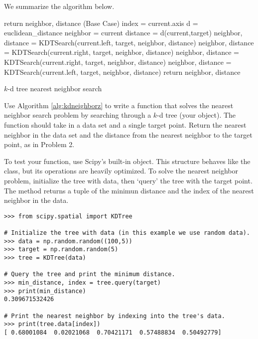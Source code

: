 We summarize the algorithm below.

\begin{algorithm}
\begin{algorithmic}[1]
    \State return neighbor, distance (Base Case)
\EndIf
\State index = current.axis
\State d = euclidean\_distance
		\State neighbor = current
		\State distance = d(current,target)
	\EndIf
		\State neighbor, distance = KDTSearch(current.left, target,
			\State									neighbor, distance)
			\State neighbor, distance = KDTSearch(current.right, target,
				\State									neighbor, distance)
		\EndIf
	\Else
		\State neighbor, distance = KDTSearch(current.right, target,
			\State									neighbor, distance)
			\State neighbor, distance = KDTSearch(current.left, target,
				\State									neighbor, distance)
		\EndIf
	\EndIf
\State return neighbor, distance
\EndProcedure
\end{algorithmic}
\caption{$k$-d tree nearest neighbor search}
\label{alg:kdneighborz}
\end{algorithm}


\begin{problem}
Use Algorithm \ref{alg:kdneighborz} to write a function that solves the nearest neighbor search problem by searching through a $k$-d tree (your  object).
The function should take in a data set and a single target point.
Return the nearest neighbor in the data set and the distance from the nearest neighbor to the target point, as in Problem 2.

To test your function, use Scipy's built-in  object.
This structure behaves like the  class, but its operations are heavily optimized.
To solve the nearest neighbor problem, initialize the tree with data, then `query' the tree with the target point.
The  method returns a tuple of the minimun distance and the index of the nearest neighbor in the data.

\begin{lstlisting}
>>> from scipy.spatial import KDTree

# Initialize the tree with data (in this example we use random data).
>>> data = np.random.random((100,5))
>>> target = np.random.random(5)
>>> tree = KDTree(data)

# Query the tree and print the minimum distance.
>>> min_distance, index = tree.query(target)
>>> print(min_distance)
0.309671532426

# Print the nearest neighbor by indexing into the tree's data.
>>> print(tree.data[index])
[ 0.68001084  0.02021068  0.70421171  0.57488834  0.50492779]
\end{lstlisting}
\end{problem}

